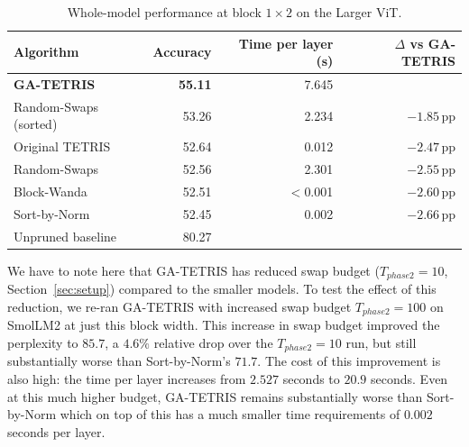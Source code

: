 \begin{table}[H]
    \centering
    \caption{Whole-model performance at block $1 \times 2$ on the Larger ViT.}
    \label{tab:time_small_block}
    \begin{tabular}{l r r r}
        \toprule
        Algorithm             & Accuracy & Time per layer (s) & $\Delta$ vs GA-TETRIS \\
        \midrule
        \textbf{GA-TETRIS}    & \textbf{55.11}  & 7.645      &       \\
        Random-Swaps (sorted) & 53.26           & 2.234      & $-1.85$\,pp \\
        Original TETRIS       & 52.64           & 0.012      & $-2.47$\,pp \\
        Random-Swaps          & 52.56           & 2.301      & $-2.55$\,pp \\
        Block-Wanda           & 52.51           & $<$0.001   & $-2.60$\,pp \\
        Sort-by-Norm          & 52.45           & 0.002      & $-2.66$\,pp \\
        \midrule
        Unpruned baseline     & 80.27           &            &      \\
        \bottomrule
    \end{tabular}
\end{table}

We have to note here that GA-TETRIS has reduced swap budget ($T_{phase2} = 10$, Section~\ref{sec:setup}) compared to the smaller models. To test the effect of this reduction, we re-ran GA-TETRIS with increased swap budget $T_{phase2} = 100$ on SmolLM2 at just this block width. This increase in swap budget improved the perplexity to $85.7$, a $4.6\%$ relative drop over the $T_{phase2} = 10$ run, but still substantially worse than Sort-by-Norm's $71.7$. The cost of this improvement is also high: the time per layer increases from $2.527$ seconds to $20.9$ seconds. Even at this much higher budget, GA-TETRIS remains substantially worse than Sort-by-Norm which on top of this has a much smaller time requirements of $0.002$\,seconds per layer.
